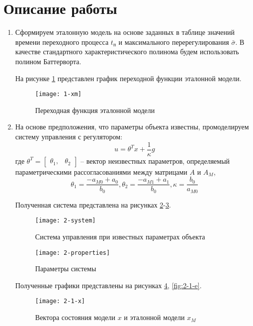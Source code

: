 \documentclass[14pt, a4paper]{extarticle}
\begin{document}
	\newpage
	
	\section*{Описание работы}
	
	\begin{enumerate}
		\item Сформируем эталонную модель на основе заданных в таблице значений времени переходного процесса $t_\text{п}$ и максимального перерегулирования $\bar{\sigma}$. В качестве стандартного характеристического полинома будем использовать полином Баттерворта. 
		
		На рисунке \ref{fig:1-xm} представлен график переходной функции эталонной модели.
		
		\begin{figure}[H]
			\centering
			\texttt{[image: 1-xm]}
			\caption{Переходная функция эталонной модели}
			\label{fig:1-xm}
		\end{figure}
		
		\item На основе предположения, что параметры объекта известны, промоделируем систему управления с регулятором:
		$$u=\theta^Tx+\frac{1}{\kappa}g$$
		где $\theta^T=\left[\begin{matrix}
			\theta_1, & \theta_2
		\end{matrix}\right]$ -- вектор неизвестных параметров, определяемый параметрическими рассогласованиями между матрицами $A$ и $A_M$,
		$$\theta_1=\frac{-a_{M0}+a_0}{b_0}, \theta_2=\frac{-a_{M1}+a_1}{b_0}, \kappa=\frac{b_0}{a_{M0}}$$
		
		Полученная система представлена на рисунках \ref{fig:2-system}-\ref{fig:2-properties}.
		
		\begin{figure}[H]
			\centering
			\texttt{[image: 2-system]}
			\caption{Система управления при известных параметрах объекта}
			\label{fig:2-system}
		\end{figure}
		
		\begin{figure}[H]
			\centering
			\texttt{[image: 2-properties]}
			\caption{Параметры системы}
			\label{fig:2-properties}
		\end{figure}
		
		Полученные графики представлены на рисунках \ref{fig:2-1-x}, \ref{fig:2-1-e}.
		
		\begin{figure}[H]
			\centering
			\texttt{[image: 2-1-x]}
			\caption{Вектора состояния модели $x$ и эталонной модели $x_M$ }
			\label{fig:2-1-x}
		\end{figure}
		

\end{enumerate}
\end{document}
